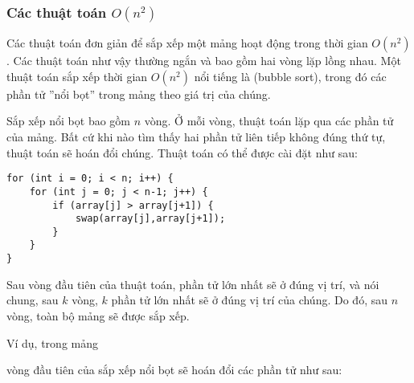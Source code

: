 \subsubsection{Các thuật toán $O(n^2)$}


Các thuật toán đơn giản để sắp xếp một mảng
hoạt động trong thời gian $O(n^2)$.
Các thuật toán như vậy thường ngắn và
bao gồm hai vòng lặp lồng nhau.
Một thuật toán sắp xếp thời gian $O(n^2)$ nổi tiếng
là  (bubble sort), trong đó các phần tử
''nổi bọt'' trong mảng theo giá trị của chúng.

Sắp xếp nổi bọt bao gồm $n$ vòng.
Ở mỗi vòng, thuật toán lặp qua
các phần tử của mảng.
Bất cứ khi nào tìm thấy hai phần tử liên tiếp
không đúng thứ tự,
thuật toán sẽ hoán đổi chúng.
Thuật toán có thể được cài đặt như sau:
\begin{lstlisting}
for (int i = 0; i < n; i++) {
    for (int j = 0; j < n-1; j++) {
        if (array[j] > array[j+1]) {
            swap(array[j],array[j+1]);
        }
    }
}
\end{lstlisting}

Sau vòng đầu tiên của thuật toán,
phần tử lớn nhất sẽ ở đúng vị trí,
và nói chung, sau $k$ vòng, $k$ phần tử
lớn nhất sẽ ở đúng vị trí của chúng.
Do đó, sau $n$ vòng, toàn bộ mảng
sẽ được sắp xếp.

Ví dụ, trong mảng

\begin{center}
\end{center}

\noindent
vòng đầu tiên của sắp xếp nổi bọt sẽ hoán đổi các phần tử
như sau:

\begin{center}
\end{center}

